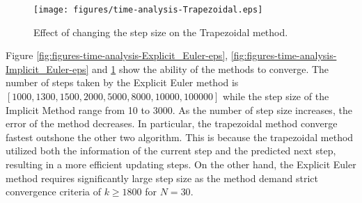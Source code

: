 \documentclass{article}
\begin{document}
\begin{figure}[H]
  \centering
  \texttt{[image: figures/time-analysis-Trapezoidal.eps]}
  \caption{Effect of changing the step size on the Trapezoidal method.}
  \label{fig:figures-time-analysis-Trapezoidal-eps}
\end{figure}

Figure \ref{fig:figures-time-analysis-Explicit_Euler-eps}, \ref{fig:figures-time-analysis-Implicit_Euler-eps} and \ref{fig:figures-time-analysis-Trapezoidal-eps}
show the ability of the methods to converge. The number of steps taken by the Explicit Euler
method is $[1000, 1300, 1500, 2000, 5000, 8000, 10000, 100000]$ while the step size of the
Implicit Method range from 10 to 3000. As the number of step size increases, the error of the
method decreases. In particular, the trapezoidal method converge fastest outshone the other two
algorithm. This is because the trapezoidal method utilized both the information of the current
step and the predicted next step, resulting in a more efficient updating steps. On the other hand,
the Explicit Euler method requires significantly large step size as the method demand strict
convergence criteria of $k \ge 1800$ for $N = 30$.
\end{document}
